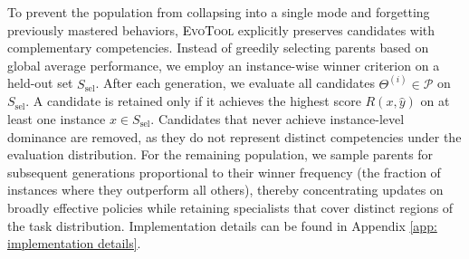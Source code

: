 \documentclass[11pt]{article}
\begin{document}


To prevent the population from collapsing into a single mode and forgetting previously mastered behaviors, \textcolor{black}{\textsc{EvoTool}} explicitly preserves candidates with complementary competencies. Instead of greedily selecting parents based on global average performance, we employ an instance-wise winner criterion on a held-out set $S_{\text{sel}}$. After each generation, we evaluate all candidates $\Theta^{(i)} \in \mathcal{P}$ on $S_{\text{sel}}$. A candidate is retained only if it achieves the highest score $R(x, \hat{y})$ on at least one instance $x \in S_{\text{sel}}$. Candidates that never achieve instance-level dominance are removed, as they do not represent distinct competencies under the evaluation distribution. For the remaining population, we sample parents for subsequent generations proportional to their winner frequency (the fraction of instances where they outperform all others), thereby concentrating updates on broadly effective policies while retaining specialists that cover distinct regions of the task distribution. Implementation details can be found in Appendix \ref{app: implementation details}.
\end{document}
